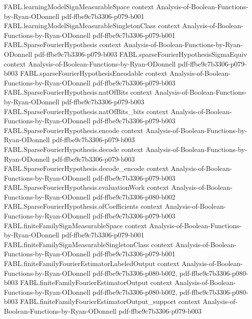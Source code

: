 \begin{theorem}
\proofstep
  {FABL.learningModelSignMeasurableSpace}
  {context}
  {Analysis-of-Boolean-Functions-by-Ryan-ODonnell}
  {pdf-ffbe9c7b3306-p079-b001}
\proofstep
  {FABL.learningModelSignMeasurableSingletonClass}
  {context}
  {Analysis-of-Boolean-Functions-by-Ryan-ODonnell}
  {pdf-ffbe9c7b3306-p079-b001}
\proofstep
  {FABL.SparseFourierHypothesis}
  {context}
  {Analysis-of-Boolean-Functions-by-Ryan-ODonnell}
  {pdf-ffbe9c7b3306-p079-b003}
\proofstep
  {FABL.sparseFourierHypothesisSigmaEquiv}
  {context}
  {Analysis-of-Boolean-Functions-by-Ryan-ODonnell}
  {pdf-ffbe9c7b3306-p079-b003}
\proofstep
  {FABL.sparseFourierHypothesisEncodable}
  {context}
  {Analysis-of-Boolean-Functions-by-Ryan-ODonnell}
  {pdf-ffbe9c7b3306-p079-b003}
\proofstep
  {FABL.SparseFourierHypothesis.natOfBits}
  {context}
  {Analysis-of-Boolean-Functions-by-Ryan-ODonnell}
  {pdf-ffbe9c7b3306-p079-b003}
\proofstep
  {FABL.SparseFourierHypothesis.natOfBits_bits}
  {context}
  {Analysis-of-Boolean-Functions-by-Ryan-ODonnell}
  {pdf-ffbe9c7b3306-p079-b003}
\proofstep
  {FABL.SparseFourierHypothesis.encode}
  {context}
  {Analysis-of-Boolean-Functions-by-Ryan-ODonnell}
  {pdf-ffbe9c7b3306-p079-b003}
\proofstep
  {FABL.SparseFourierHypothesis.decode}
  {context}
  {Analysis-of-Boolean-Functions-by-Ryan-ODonnell}
  {pdf-ffbe9c7b3306-p079-b003}
\proofstep
  {FABL.SparseFourierHypothesis.decode_encode}
  {context}
  {Analysis-of-Boolean-Functions-by-Ryan-ODonnell}
  {pdf-ffbe9c7b3306-p079-b003}
\proofstep
  {FABL.SparseFourierHypothesis.evaluationWork}
  {context}
  {Analysis-of-Boolean-Functions-by-Ryan-ODonnell}
  {pdf-ffbe9c7b3306-p080-b002}
\proofstep
  {FABL.SparseFourierHypothesis.ofCoefficients}
  {context}
  {Analysis-of-Boolean-Functions-by-Ryan-ODonnell}
  {pdf-ffbe9c7b3306-p079-b003}
\proofstep
  {FABL.finiteFamilySignMeasurableSpace}
  {context}
  {Analysis-of-Boolean-Functions-by-Ryan-ODonnell}
  {pdf-ffbe9c7b3306-p079-b001}
\proofstep
  {FABL.finiteFamilySignMeasurableSingletonClass}
  {context}
  {Analysis-of-Boolean-Functions-by-Ryan-ODonnell}
  {pdf-ffbe9c7b3306-p079-b001}
\proofstep
  {FABL.finiteFamilyFourierEstimatorLabeledOutput}
  {context}
  {Analysis-of-Boolean-Functions-by-Ryan-ODonnell}
  {pdf-ffbe9c7b3306-p080-b002,
    pdf-ffbe9c7b3306-p080-b003}
\proofstep
  {FABL.finiteFamilyFourierEstimatorOutput}
  {context}
  {Analysis-of-Boolean-Functions-by-Ryan-ODonnell}
  {pdf-ffbe9c7b3306-p080-b002,
    pdf-ffbe9c7b3306-p080-b003}
\proofstep
  {FABL.finiteFamilyFourierEstimatorOutput_support}
  {context}
  {Analysis-of-Boolean-Functions-by-Ryan-ODonnell}
  {pdf-ffbe9c7b3306-p079-b003}

\end{theorem}
